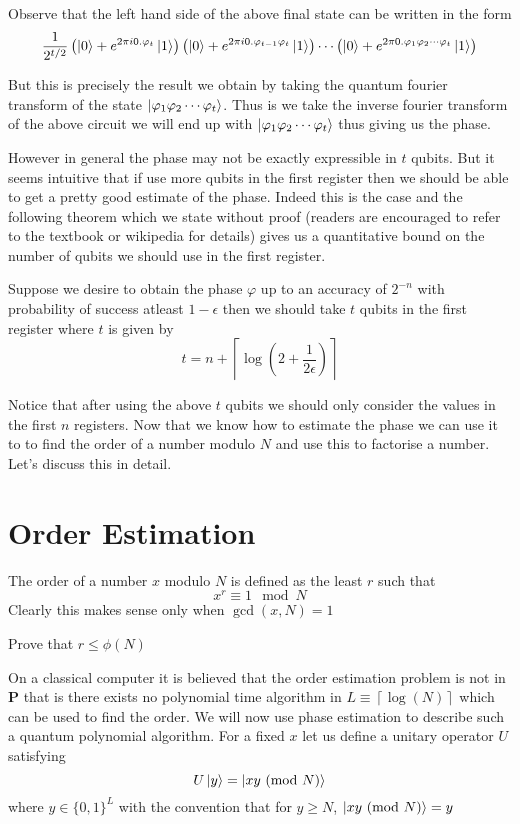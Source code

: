 Observe that the left hand side of the above final state can be written in the form $$\frac{1}{2^{t/2}}\left( \ket{0} + e^{2\pi i0.\varphi_{t}}\ket{1} \right)\left( \ket{0} + e^{2\pi i0.\varphi_{t-1}\varphi_{t}}\ket{1} \right) \cdots \left( \ket{0} + e^{2\pi 0.\varphi_{1}\varphi_{2}\cdots\varphi_{t}}\ket{1} \right)$$

But this is precisely the result we obtain by taking the quantum fourier transform of the state $\ket{\varphi_{1}\varphi_{2} \cdots \varphi_{t}}$. Thus is we take the inverse fourier transform of the above circuit we will end up with $\ket{\varphi_{1}\varphi_{2} \cdots \varphi_{t}}$ thus giving us the phase.

However in general the phase may not be exactly expressible in $t$ qubits. But it seems intuitive that if use more qubits in the first register then we should be able to get a pretty good estimate of the phase. Indeed this is the case and the following theorem which we state without proof (readers are encouraged to refer to the textbook or wikipedia for details) gives us a quantitative bound on the number of qubits we should use in the first register.

\begin{theorem}
Suppose we desire to obtain the phase $\varphi$ up to an accuracy of $2^{-n}$ with probability of success atleast $1 - \epsilon$ then we should take $t$ qubits in the first register where $t$ is given by
$$ t = n + \left \lceil{\log(2 + \frac{1}{2\epsilon})}\right \rceil $$
\end{theorem}

Notice that after using the above $t$ qubits we should only consider the values in the first $n$ registers. Now that we know how to estimate the phase we can use it to to find the order of a number modulo $N$ and use this to factorise a number. Let's discuss this in detail.

\section{Order Estimation}
The order of a number $x$ modulo $N$ is defined as the least $r$ such that $$ x^r \equiv 1  \mod N$$ Clearly this makes sense only when $\gcd(x, N) = 1$
\begin{exercise}
Prove that $r \leq \phi(N)$
\end{exercise}

On a classical computer it is believed that the order estimation problem is not in $\textbf{P}$ that is there exists no polynomial time algorithm in $L \equiv \left \lceil{ \log(N)} \right \rceil$ which can be used to find the order. We will now use phase estimation to describe such a quantum polynomial algorithm.
For a fixed $x$ let us define a unitary operator $U$ satisfying 
$$U\ket{y} = \ket{xy \ (\mathrm{mod}\ N)}$$ where $y \in \{0, 1\}^L$ with the convention that for $y \geq N$, $\ket{xy \ (\mathrm{mod}\ N)} = y$

